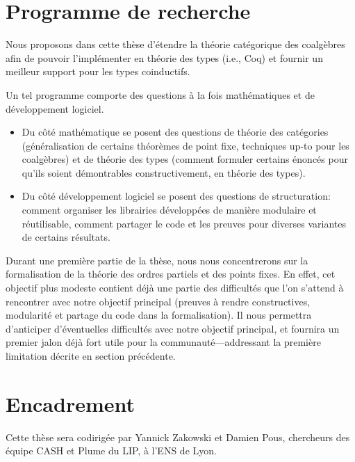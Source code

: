 \documentclass[a4paper,11pt]{article}
\begin{document}
\section{Programme de recherche}

Nous proposons dans cette thèse d'étendre la théorie catégorique des coalgèbres afin de pouvoir l'implémenter en théorie des types (i.e., Coq) et fournir un meilleur support pour les types coinductifs.

Un tel programme comporte des questions à la fois mathématiques et de développement logiciel.
\begin{itemize}
\item Du côté mathématique se posent des questions de théorie des catégories (généralisation de certains théorèmes de point fixe, techniques up-to pour les coalgèbres) et de théorie des types (comment formuler certains énoncés pour qu'ils soient démontrables constructivement, en théorie des types).
\item Du côté développement logiciel se posent des questions de structuration: comment organiser les librairies développées de manière modulaire et réutilisable, comment partager le code et les preuves pour diverses variantes de certains résultats. 
\end{itemize}

Durant une première partie de la thèse, nous nous concentrerons sur la
formalisation de la théorie des ordres partiels et des points fixes. En effet,
cet objectif plus modeste contient déjà une partie des difficultés que l'on
s'attend à rencontrer avec notre objectif principal (preuves à rendre
constructives, modularité et partage du code dans la formalisation). Il nous
permettra d'anticiper d'éventuelles difficultés avec notre objectif principal,
et fournira un premier jalon déjà fort utile pour la communauté---addressant la
première limitation décrite en section précédente.

\section{Encadrement}

Cette thèse sera codirigée par Yannick Zakowski et Damien Pous, chercheurs des équipe CASH et Plume du LIP, à l'ENS de Lyon.



\end{document}
